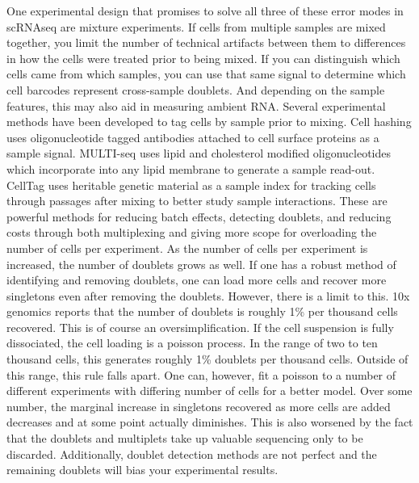\par{
One experimental design that promises to solve all three of these error modes in scRNAseq are mixture experiments. If cells from multiple samples are mixed together, you limit the number of technical artifacts between them to differences in how the cells were treated prior to being mixed. If you can distinguish which cells came from which samples, you can use that same signal to determine which cell barcodes represent cross-sample doublets. And depending on the sample features, this may also aid in measuring ambient RNA. Several experimental methods have been developed to tag cells by sample prior to mixing. Cell hashing uses oligonucleotide tagged antibodies attached to cell surface proteins as a sample signal\cite{cellhashing}\cite{nucleimulti}. MULTI-seq uses lipid and cholesterol modified oligonucleotides which incorporate into any lipid membrane to generate a sample read-out\cite{multiseq}. CellTag uses heritable genetic material as a sample index for tracking cells through passages after mixing to better study sample interactions\cite{celltag}. These are powerful methods for reducing batch effects, detecting doublets, and reducing costs through both multiplexing and giving more scope for overloading the number of cells per experiment. As the number of cells per experiment is increased, the number of doublets grows as well. If one has a robust method of identifying and removing doublets, one can load more cells and recover more singletons even after removing the doublets. However, there is a limit to this. 10x genomics reports that the number of doublets is roughly 1\% per thousand cells recovered. This is of course an oversimplification. If the cell suspension is fully dissociated, the cell loading is a poisson process. In the range of two to ten thousand cells, this generates roughly 1\% doublets per thousand cells. Outside of this range, this rule falls apart. One can, however, fit a poisson to a number of different experiments with differing number of cells for a better model. Over some number, the marginal increase in singletons recovered as more cells are added decreases and at some point actually diminishes. This is also worsened by the fact that the doublets and multiplets take up valuable sequencing only to be discarded. Additionally, doublet detection methods are not perfect and the remaining doublets will bias your experimental results. 
} 

